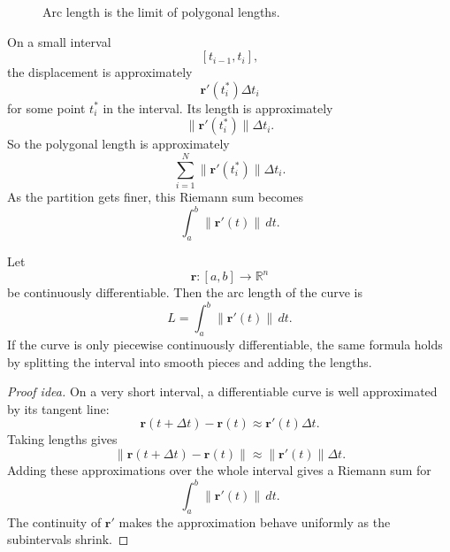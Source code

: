 \begin{figure}[h]
\centering
{}
\caption{Arc length is the limit of polygonal lengths.}
\end{figure}

On a small interval
\[
    [t_{i-1},t_i],
\]
the displacement is approximately
\[
    \mathbf r'(t_i^*)\Delta t_i
\]
for some point \(t_i^*\) in the interval.  Its length is approximately
\[
    \|\mathbf r'(t_i^*)\|\Delta t_i.
\]
So the polygonal length is approximately
\[
    \sum_{i=1}^N \|\mathbf r'(t_i^*)\|\Delta t_i.
\]
As the partition gets finer, this Riemann sum becomes
\[
    \int_a^b \|\mathbf r'(t)\|\,dt.
\]

\begin{theorem}
Let
\[
    \mathbf r:[a,b]\to\mathbb R^n
\]
be continuously differentiable.  Then the arc length of the curve is
\[
\boxed{
    L=\int_a^b \|\mathbf r'(t)\|\,dt.
}
\]
If the curve is only piecewise continuously differentiable, the same formula holds by
splitting the interval into smooth pieces and adding the lengths.
\end{theorem}

\begin{proof}[Proof idea]
On a very short interval, a differentiable curve is well approximated by its tangent line:
\[
    \mathbf r(t+\Delta t)-\mathbf r(t)
    \approx
    \mathbf r'(t)\Delta t.
\]
Taking lengths gives
\[
    \|\mathbf r(t+\Delta t)-\mathbf r(t)\|
    \approx
    \|\mathbf r'(t)\|\Delta t.
\]
Adding these approximations over the whole interval gives a Riemann sum for
\[
    \int_a^b \|\mathbf r'(t)\|\,dt.
\]
The continuity of \(\mathbf r'\) makes the approximation behave uniformly as the
subintervals shrink.
\end{proof}

